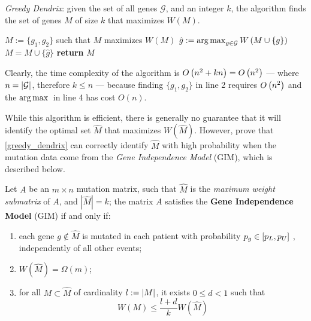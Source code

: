 \begin{algorithm}[H]
    \caption{
        \textit{Greedy Dendrix}: given the set of all genes $\mathcal G$, and an integer $k$, the algorithm finds the set of genes $M$ of size $k$ that maximizes $W(M)$.
    }

        \label{greedy_dendrix}
    \begin{algorithmic}[1]
            \State $M := \{g_1, g_2\}$ such that $M$ maximizes $W(M)$ 
                \State $\hat g := \operatorname*{arg\,max}_{g \in \mathcal G}{W \left(M \cup \{g\}\right)}$ 
                \State $M = M \cup \{\hat g\}$
            \EndFor
            \State \textbf{return} $M$
        \EndFunction
    \end{algorithmic}
\end{algorithm}

Clearly, the time complexity of the algorithm is $O\left(n^2 + kn\right) = O\left(n^2\right)$ --- where $n = \left|\mathcal G\right|$, therefore $k \le n$ --- because finding $\{g_1, g_2\}$ in line 2 requires $O\left(n^2\right)$ and the $\operatorname*{arg\,max}{}$ in line 4 has cost $O(n)$. 

While this algorithm is efficient, there is generally no guarantee that it will identify the optimal set $\hat M$ that maximizes $W(\hat M)$. However, \textcite{dendrix} prove that \cref{greedy_dendrix} can correctly identify $\hat M$ with high probability when the mutation data come from the \textit{Gene Independence Model} (GIM), which is described below. 

\begin{definition} 
    Let $A$ be an $m \times n$ mutation matrix, such that $\hat M$ is the \textit{maximum weight submatrix} of $A$, and $|\hat M| = k$; the matrix $A$ satisfies the \textbf{Gene Independence Model} (GIM) if and only if:

    \begin{enumerate}[label=\roman*), font=\itshape]
        \item each gene $g \notin \hat M$ is mutated in each patient with probability $p_g \in \left[p_L, p_U\right]$ , independently of all other events;
        \item $W (\hat M)= \Omega(m)$; 
        \item for all $M \subset \hat M$ of cardinality $l := \left|M\right|$, it exists $0 \le d < 1$ such that $$W(M) \le \frac{l + d}{k} W(\hat M)$$
    \end{enumerate}
\end{definition}

